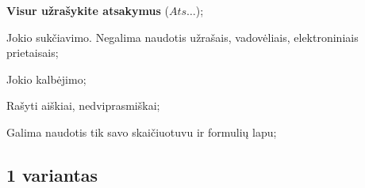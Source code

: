 \documentclass[a4paper]{article}
\begin{document}
\begin{small}
      \begin{enumerate*}[label={(\arabic*)}]
            \item \textbf{Visur užrašykite atsakymus} ($Ats\ldots$);
            \item Jokio sukčiavimo. Negalima naudotis užrašais, vadovėliais,
            elektroniniais prietaisais;
            \item Jokio kalbėjimo;
            \item Rašyti aiškiai, nedviprasmiškai;
            \item Galima naudotis tik savo skaičiuotuvu ir formulių lapu;
      \end{enumerate*}
\end{small}

\vspace{10 em}

\subsection*{1 variantas}
\end{document}
